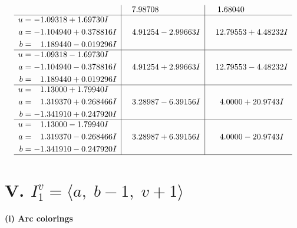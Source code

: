 \documentclass[1p]{elsarticle_modified}
\theoremstyle{definition}
\begin{document}
$$\begin{array}{c|c|c}
 & \phantom{-}7.98708\phantom{ +0.000000I} & \phantom{-}1.68040\phantom{ +0.000000I} \\ \hline\begin{aligned}
u &= -1.09318 + 1.69730 I \\
a &= -1.104940 + 0.378816 I \\
b &= \phantom{-}1.189440 - 0.019296 I\end{aligned}
 & \phantom{-}4.91254 - 2.99663 I & \phantom{-}12.79553 + 4.48232 I \\ \hline\begin{aligned}
u &= -1.09318 - 1.69730 I \\
a &= -1.104940 - 0.378816 I \\
b &= \phantom{-}1.189440 + 0.019296 I\end{aligned}
 & \phantom{-}4.91254 + 2.99663 I & \phantom{-}12.79553 - 4.48232 I \\ \hline\begin{aligned}
u &= \phantom{-}1.13000 + 1.79940 I \\
a &= \phantom{-}1.319370 + 0.268466 I \\
b &= -1.341910 + 0.247920 I\end{aligned}
 & \phantom{-}3.28987 - 6.39156 I & \phantom{-}4.0000 + 20.9743 I \\ \hline\begin{aligned}
u &= \phantom{-}1.13000 - 1.79940 I \\
a &= \phantom{-}1.319370 - 0.268466 I \\
b &= -1.341910 - 0.247920 I\end{aligned}
 & \phantom{-}3.28987 + 6.39156 I & \phantom{-}4.0000 - 20.9743 I\\
 \hline 
 \end{array}$$\newpage\newpage\renewcommand{\arraystretch}{1}
\centering \section*{V. $I^v_{1}= \langle a,\;b-1,\;v+1 \rangle$}
\flushleft \textbf{(i) Arc colorings}\\
\end{document}
